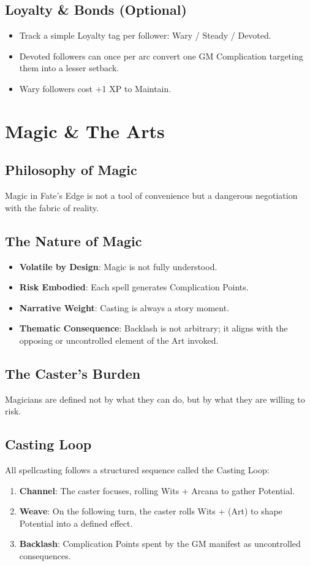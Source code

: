 \documentclass[11pt]{article}
\begin{document}
\subsection{Loyalty \& Bonds (Optional)}
\begin{itemize}
    \item Track a simple Loyalty tag per follower: Wary / Steady / Devoted.
    \item Devoted followers can once per arc convert one GM Complication targeting them into a lesser setback.
    \item Wary followers cost +1 XP to Maintain.
\end{itemize}

\section{Magic \& The Arts}

\subsection{Philosophy of Magic}
Magic in Fate's Edge is not a tool of convenience but a dangerous negotiation with the fabric of reality.

\subsection{The Nature of Magic}
\begin{itemize}
    \item \textbf{Volatile by Design}: Magic is not fully understood.
    \item \textbf{Risk Embodied}: Each spell generates Complication Points.
    \item \textbf{Narrative Weight}: Casting is always a story moment.
    \item \textbf{Thematic Consequence}: Backlash is not arbitrary; it aligns with the opposing or uncontrolled element of the Art invoked.
\end{itemize}

\subsection{The Caster's Burden}
Magicians are defined not by what they can do, but by what they are willing to risk.

\subsection{Casting Loop}
All spellcasting follows a structured sequence called the Casting Loop:
\begin{enumerate}
    \item \textbf{Channel}: The caster focuses, rolling Wits + Arcana to gather Potential.
    \item \textbf{Weave}: On the following turn, the caster rolls Wits + (Art) to shape Potential into a defined effect.
    \item \textbf{Backlash}: Complication Points spent by the GM manifest as uncontrolled consequences.
\end{enumerate}
\end{document}
